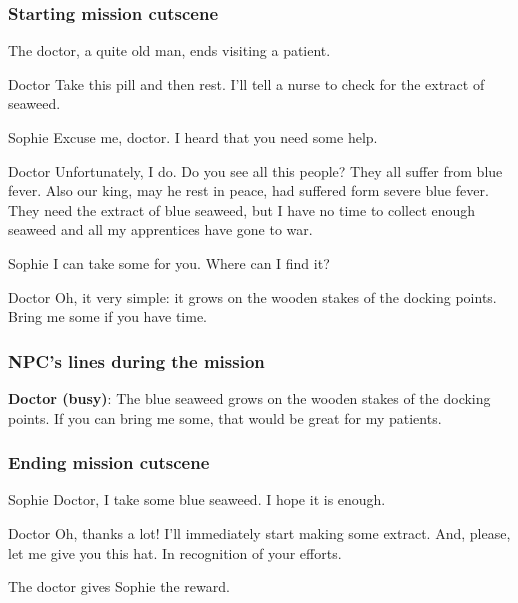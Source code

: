 \subsubsection*{Starting mission cutscene}
\begin{screenplay}

The doctor, a quite old man, ends visiting a patient.

\begin{dialogue}{Doctor}
Take this pill and then rest. I'll tell a nurse to check for the extract of seaweed.
\end{dialogue}

\begin{dialogue}{Sophie}
Excuse me, doctor. I heard that you need some help.
\end{dialogue}

\begin{dialogue}{Doctor}
Unfortunately, I do. Do you see all this people? They all suffer from blue fever. Also our king, may he rest in peace, had suffered form severe blue fever. They need the extract of blue seaweed, but I have no time to collect enough seaweed and all my apprentices have gone to war.
\end{dialogue}

\begin{dialogue}{Sophie}
I can take some for you. Where can I find it?
\end{dialogue}

\begin{dialogue}{Doctor}
Oh, it very simple: it grows on the wooden stakes of the docking points. Bring me some if you have time.
\end{dialogue}

\end{screenplay}

\subsubsection*{NPC's lines during the mission}
\textbf{Doctor (busy)}: The blue seaweed grows on the wooden stakes of the docking points. If you can bring me some, that would be great for my patients.

\subsubsection*{Ending mission cutscene}
\begin{screenplay}

\begin{dialogue}{Sophie}
Doctor, I take some blue seaweed. I hope it is enough.
\end{dialogue}

\begin{dialogue}{Doctor}
Oh, thanks a lot! I'll immediately start making some extract. And, please, let me give you this hat. In recognition of your efforts.
\end{dialogue}

The doctor gives Sophie the reward.

\end{screenplay}

